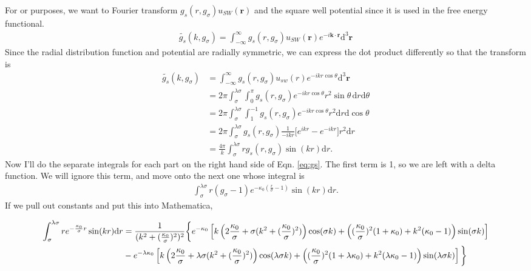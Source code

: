 \documentclass[letterpaper,twocolumn,amsmath,amssymb,pre,aps,10pt]{revtex4-1}
\newcommand\kk{\mathbf{k}}
\newcommand\rr{\mathbf{r}}
\begin{document}
\newcommand\kapovsig[1]{\frac{\kappa_{#1}}{\sigma}}

For or purposes, we want to Fourier transform $g_s(r,g_\sigma)u_{SW}(\rr)$ and
the square well potential since it is used in the free energy functional.
\begin{align}
  \tilde{g_s}(k, g_\sigma) =\int^\infty_{-\infty} g_s(r, g_\sigma)u_{SW}(\rr)e^{-i\kk \cdot \rr}\mathrm{d}^3\rr
\end{align}
Since the radial distribution function and potential are radially symmetric, we can
express the dot product differently so that the transform is
\begin{align}
  \tilde{g_s}(k, g_\sigma) &=\int^\infty_{-\infty} g_s(r,
  g_\sigma)u_{sw}(r)e^{-ikr \cos \theta}\mathrm{d}^3\rr \\
  &= 2 \pi \int_\sigma^{\lambda \sigma} \int_0^\pi g_s(r, g_\sigma) e^{-ikr \cos
    \theta} r^2 \sin \theta \, \mathrm{d}r \mathrm{d}\theta \\
  &= 2\pi\int_\sigma^{\lambda \sigma} \int_{1}^{-1} g_s(r, g_\sigma) e^{-ikr \cos
    \theta} r^2 \mathrm{d}r \mathrm{d}\cos \theta \\
  &= 2\pi\int_\sigma^{\lambda \sigma} g_s(r, g_\sigma) \frac{1}{-ikr}\bigg[e^{ikr} -
    e^{-ikr} \bigg]r^2 \mathrm{d}r \\
 &= \frac {4\pi}{k}\int_\sigma^{\lambda \sigma} r g_s(r,g_\sigma) \sin (kr) \mathrm{d}r.
\end{align}
Now I'll do the separate integrals for each part on the right hand
side of Eqn. \ref{eq:gs}. The first term is 1, so we are left with
a delta function.  We will ignore this term, and
move onto the next one whose integral is
\begin{align}
  \int_\sigma^{\lambda \sigma}r(g_\sigma -1) e^{-\kappa_0
    \left( \frac{r}{\sigma}-1 \right)} \sin(kr)\mathrm{d}r.
\end{align}
If we pull out constants and put this into Mathematica,
\begin{widetext}
  \begin{align}
  \int_\sigma^{\lambda
    \sigma}re^{-\frac{\kappa_0}{\sigma}r}\sin(kr)\mathrm{d}r
  &= \frac{1}{(k^2 + (\kapovsig{0})^2)^2} \bigg\{ e^{-\kappaO} \left[k
      \left(2\kapovsig{0} + \sigma (k^2 + (\kapovsig{0})^2) \right)
      \cos (\sigma k) + \left((\kapovsig{0})^2(1 + \kappaO) +
      k^2(\kappaO-1)\right) \sin (\sigma k) \right] \notag \\
  &- e^{-\lambda
    \kappaO} \left[ k
      \left(2\kapovsig{0} + \lambda \sigma (k^2 + (\kapovsig{0})^2) \right)
      \cos (\lambda \sigma k) + \left((\kapovsig{0})^2(1 + \lambda \kappaO) +
      k^2(\lambda\kappaO-1)\right) \sin (\lambda \sigma k)\right] \bigg\}
  \end{align}
\end{widetext}
\end{document}
